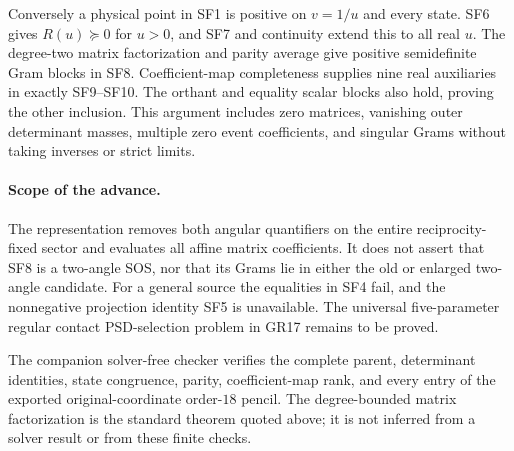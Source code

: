 Conversely a physical point in SF1 is positive on $v=1/u$ and every
state.  SF6 gives $R(u)\succeq0$ for $u>0$, and SF7 and continuity
extend this to all real $u$.  The degree-two matrix factorization and
parity average give positive semidefinite Gram blocks in SF8.
Coefficient-map completeness supplies nine real auxiliaries in exactly
SF9--SF10.  The orthant and equality scalar blocks also hold, proving
the other inclusion.  This argument includes zero matrices, vanishing
outer determinant masses, multiple zero event coefficients, and
singular Grams without taking inverses or strict limits.

\paragraph{Scope of the advance.}
The representation removes both angular quantifiers on the entire
reciprocity-fixed sector and evaluates all affine matrix coefficients.
It does not assert that SF8 is a two-angle SOS, nor that its Grams lie
in either the old or enlarged two-angle candidate.  For a general
source the equalities in SF4 fail, and the nonnegative projection
identity SF5 is unavailable.  The universal five-parameter regular
contact PSD-selection problem in GR17 remains to be proved.

The companion solver-free checker verifies the complete parent,
determinant identities, state congruence, parity, coefficient-map rank,
and every entry of the exported original-coordinate order-$18$ pencil.
The degree-bounded matrix factorization is the standard theorem quoted
above; it is not inferred from a solver result or from these finite checks.
